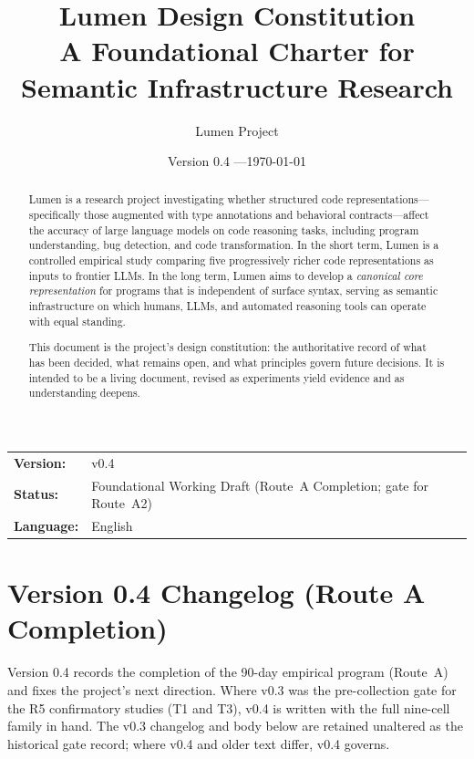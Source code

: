 \documentclass[11pt]{article}
\title{%
  \textbf{Lumen Design Constitution}\\[0.5em]
  \large A Foundational Charter for Semantic Infrastructure Research
}
\author{Lumen Project}
\date{Version 0.4 \quad---\quad \today}
\begin{document}
\maketitle

\begin{center}
  \begin{tabular}{@{}ll@{}}
    \textbf{Version:} & v0.4 \\
    \textbf{Status:}  & Foundational Working Draft (Route~A Completion; gate for Route~A2) \\
    \textbf{Language:} & English \\
  \end{tabular}
\end{center}

\vspace{1em}

\begin{abstract}
Lumen is a research project investigating whether structured code
representations---specifically those augmented with type annotations
and behavioral contracts---affect the accuracy of large language models
on code reasoning tasks, including program understanding, bug
detection, and code transformation.  In the short term, Lumen is a
controlled empirical study comparing five progressively richer code
representations as inputs to frontier LLMs.  In the long term, Lumen
aims to develop a \emph{canonical core representation} for programs
that is independent of surface syntax, serving as semantic
infrastructure on which humans, LLMs, and automated reasoning tools
can operate with equal standing.

This document is the project's design constitution: the authoritative
record of what has been decided, what remains open, and what principles
govern future decisions.  It is intended to be a living document,
revised as experiments yield evidence and as understanding deepens.
\end{abstract}

\section*{Version 0.4 Changelog (Route A Completion)}

Version 0.4 records the completion of the 90-day empirical program
(Route~A) and fixes the project's next direction. Where v0.3 was the
pre-collection gate for the R5 confirmatory studies (T1 and T3), v0.4 is
written with the full nine-cell family in hand. The v0.3 changelog and
body below are retained unaltered as the historical gate record; where
v0.4 and older text differ, v0.4 governs.
\end{document}
